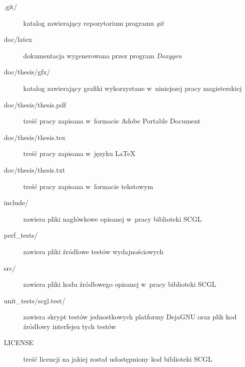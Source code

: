\documentclass[a4paper,12pt,polish,twoside,openright]{thesis}
\begin{document}
\begin{description}
	\item [{.git/}] katalog zawierający repozytorium programu \emph{git}
	\item [{doc/latex}] dokumentacja wygenerowana przez program \emph{Doxygen}
	\item [{doc/thesis/gfx/}] katalog zawierający grafiki wykorzystane w~niniejszej pracy magisterskiej
	\item [{doc/thesis/thesis.pdf}] treść pracy zapisana w~formacie Adobe Portable Document
	\item [{doc/thesis/thesis.tex}] treść pracy zapisana w~języku \LaTeX
	\item [{doc/thesis/thesis.txt}] treść pracy zapisana w~formacie tekstowym
	\item [{include/}] zawiera pliki nagłówkowe opisanej w~pracy biblioteki SCGL
	\item [{perf\_tests/}] zawiera pliki źródłowe testów wydajnościowych
	\item [{src/}] zawiera pliki kodu źródłowego opisanej w~pracy biblioteki SCGL
	\item [{unit\_tests/scgl.test/}] zawiera skrypt testów jednostkowych platformy DejaGNU oraz plik kod źródłowy interfejsu tych testów
	\item [{LICENSE}] treść licencji na jakiej został udostępniony kod biblioteki SCGL
\end{description}

\listoffigures
\listoftables
\lstlistoflistings
\end{document}
